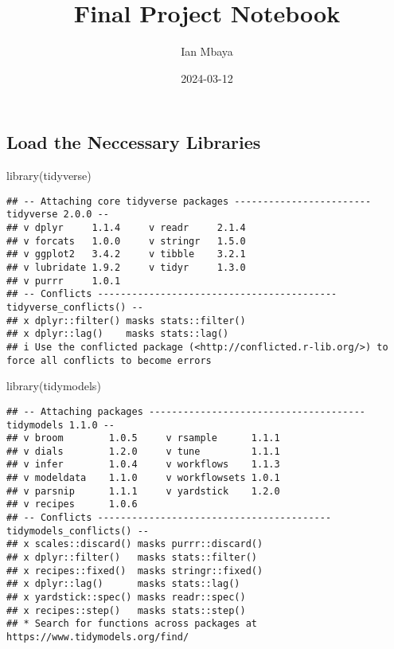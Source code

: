 \documentclass[
]{article}
\title{Final Project Notebook}
\author{Ian Mbaya}
\date{2024-03-12}
\newenvironment{Shaded}{\begin{snugshade}}{\end{snugshade}}
\newcommand{\FunctionTok}[1]{\textcolor[rgb]{0.00,0.00,0.00}{#1}}
\newcommand{\NormalTok}[1]{#1}
\newcommand{\StringTok}[1]{\textcolor[rgb]{0.31,0.60,0.02}{#1}}
\begin{document}
\maketitle

\hypertarget{load-the-neccessary-libraries}{%
\subsection{Load the Neccessary
Libraries}\label{load-the-neccessary-libraries}}

\begin{Shaded}
\begin{Highlighting}[]
\FunctionTok{library}\NormalTok{(}\StringTok{\textquotesingle{}tidyverse\textquotesingle{}}\NormalTok{)}
\end{Highlighting}
\end{Shaded}

\begin{verbatim}
## -- Attaching core tidyverse packages ------------------------ tidyverse 2.0.0 --
## v dplyr     1.1.4     v readr     2.1.4
## v forcats   1.0.0     v stringr   1.5.0
## v ggplot2   3.4.2     v tibble    3.2.1
## v lubridate 1.9.2     v tidyr     1.3.0
## v purrr     1.0.1     
## -- Conflicts ------------------------------------------ tidyverse_conflicts() --
## x dplyr::filter() masks stats::filter()
## x dplyr::lag()    masks stats::lag()
## i Use the conflicted package (<http://conflicted.r-lib.org/>) to force all conflicts to become errors
\end{verbatim}

\begin{Shaded}
\begin{Highlighting}[]
\FunctionTok{library}\NormalTok{(}\StringTok{\textquotesingle{}tidymodels\textquotesingle{}}\NormalTok{)}
\end{Highlighting}
\end{Shaded}

\begin{verbatim}
## -- Attaching packages -------------------------------------- tidymodels 1.1.0 --
## v broom        1.0.5     v rsample      1.1.1
## v dials        1.2.0     v tune         1.1.1
## v infer        1.0.4     v workflows    1.1.3
## v modeldata    1.1.0     v workflowsets 1.0.1
## v parsnip      1.1.1     v yardstick    1.2.0
## v recipes      1.0.6     
## -- Conflicts ----------------------------------------- tidymodels_conflicts() --
## x scales::discard() masks purrr::discard()
## x dplyr::filter()   masks stats::filter()
## x recipes::fixed()  masks stringr::fixed()
## x dplyr::lag()      masks stats::lag()
## x yardstick::spec() masks readr::spec()
## x recipes::step()   masks stats::step()
## * Search for functions across packages at https://www.tidymodels.org/find/
\end{verbatim}
\end{document}
